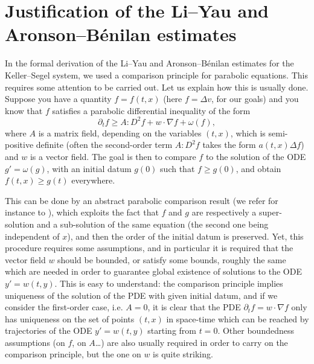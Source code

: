 \documentclass[11pt,a4paper]{article}
\numberwithin{equation}{section}
\theoremstyle{plain}
\theoremstyle{remark}
\begin{document}





\section{Justification of the Li--Yau and  Aronson--B\'enilan estimates}\label{sec:justification}   
In the formal derivation of the Li--Yau and Aronson--B\'enilan estimates for the Keller--Segel system, we used a comparison principle for parabolic equations. This requires some attention to be carried out. Let us explain how this is usually done. Suppose you have a quantity $f=f(t,x)$ (here $f=\Delta v$, for our goals) and you know that $f$ satisfies a parabolic differential inequality of the form
$$\partial_t f\geq A:D^2f+w\cdot \nabla f+\omega(f),$$
where $A$ is a matrix field, depending on the variables $(t,x)$, which is semi-positive definite (often the second-order term $A:D^2f$ takes the form $a(t,x)\Delta f$) and $w$ is a vector field. The goal is then to compare $f$ to the solution of the ODE $g'=\omega(g)$, with an initial datum $g(0)$ such that $f\geq g(0)$, and obtain $f(t,x)\geq g(t)$ everywhere. 

This can be done by an abstract parabolic comparison result (we refer for instance to \cite[Theorem 9.7]{Lieberman96}), which exploits the fact that $f$ and $g$ are respectively a super-solution and a sub-solution of the same equation (the second one being independent of $x$), and then the order of the initial datum is preserved. Yet, this procedure requires some assumptions, and in particular it is required that the vector field $w$ should be bounded, or satisfy some bounds, roughly the same which are needed in order to guarantee global existence of solutions to the ODE $y'=w(t,y)$. This is easy to understand: the comparison principle implies uniqueness of the solution of the PDE with given initial datum, and if we consider the first-order case, i.e. $A=0$, it is clear that the PDE $\partial_t f=w\cdot\nabla f$ only has uniqueness on the set of points $(t,x)$ in space-time which can be reached by trajectories of the ODE $y'=w(t,y)$ starting from $t=0$. Other boundedness assumptions (on $f$, on $A$\dots) are also usually required in order to carry on the comparison principle, but the one on $w$ is quite striking.
\end{document}
